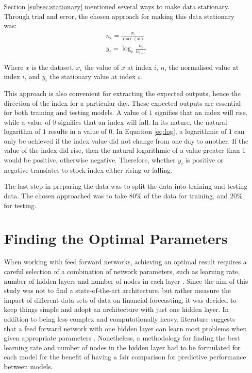 \documentclass{UoYCSproject}
\begin{document}
Section \ref{subsec:stationary} mentioned several ways to make data stationary. Through trial and error, the chosen approach for making this data stationary was:
\begin{align}
n_i = \frac{x_i}{\max(x)} \label{eq:normalised} \\ 
y_i = \log_e\frac{n_i}{n_{i-1}} \label{eq:log} 
\end{align}

Where $x$ is the dataset, $x_i$ the value of $x$ at index $i$, $n_i$ the normalised value at index $i$, and $y_i$ the stationary value at index $i$. 

This approach is also convenient for extracting the expected outputs, hence the direction of the index for a particular day. These expected outputs are essential for both training and testing models. A value of $1$ signifies that an index will rise, while a value of $0$ signifies that an index will fall. In its nature, the natural logarithm of $1$ results in a value of 0. In Equation \ref{eq:log}, a logarithmic of $1$ can only be achieved if the index value did not change from one day to another. If the value of the index did rise, then the natural logarithmic of a value greater than $1$ would be positive, otherwise negative. Therefore, whether $y_i$ is positive or negative translates to stock index either rising or falling.

The last step in preparing the data was to split the data into training and testing data. The chosen approached was to take $80$\% of the data for training, and $20$\% for testing.

\section{Finding the Optimal Parameters}
\label{sec:optimalparams}
When working with feed forward networks, achieving an optimal result requires a careful selection of a combination of network parameters, such as learning rate, number of hidden layers and number of nodes in each layer \cite{hussain2008financial}. Since the aim of this study was not to find a state-of-the-art architecture, but rather measure the impact of different data sets of data on financial forecasting, it was decided to keep things simple and adopt an architecture with just one hidden layer. In addition to being less complex and computationally heavy, literature suggests that a feed forward network with one hidden layer can learn most problems when given appropriate parameters \cite{cybenko1989approximation}. Nonetheless, a methodology for finding the best learning rate and number of nodes in the hidden layer had to be formulated for each model for the benefit of having a fair comparison for predictive performance between models.   
\end{document}
